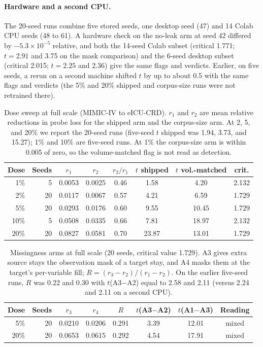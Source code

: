\documentclass[10pt]{article}
\theoremstyle{definition}
\begin{document}
\paragraph{Hardware and a second CPU.} The 20-seed runs combine five stored seeds, one desktop seed (47) and 14 Colab CPU seeds (48 to 61). A hardware check on the no-leak arm at seed 42 differed by $-5.3\times 10^{-5}$ relative, and both the 14-seed Colab subset (critical 1.771; $t=2.91$ and 3.75 on the mask comparison) and the 6-seed desktop subset (critical 2.015; $t=2.25$ and 2.36) give the same flags and verdicts. Earlier, on five seeds, a rerun on a second machine shifted $t$ by up to about 0.5 with the same flags and verdicts (the 5\% and 20\% shipped and corpus-size runs were not retrained there).

\begin{table}[h]
\centering\footnotesize\setlength{\tabcolsep}{4pt}
\begin{tabular}{@{}rrcccccc@{}}
\toprule
Dose & Seeds & $r_1$ & $r_2$ & $r_2/r_1$ & $t$ shipped & $t$ vol.-matched & crit.\\
\midrule
1\%  & 5  & 0.0053 & 0.0025 & 0.46 & 1.58 & 4.20 & 2.132\\
2\%  & 20 & 0.0117 & 0.0067 & 0.57 & 4.21 & 6.59 & 1.729\\
5\%  & 20 & 0.0293 & 0.0176 & 0.60 & 9.55 & 10.45 & 1.729\\
10\% & 5  & 0.0508 & 0.0335 & 0.66 & 7.81 & 18.97 & 2.132\\
20\% & 20 & 0.0827 & 0.0581 & 0.70 & 23.87 & 13.01 & 1.729\\
\bottomrule
\end{tabular}
\caption{Dose sweep at full scale (MIMIC-IV to eICU-CRD). $r_1$ and $r_2$ are mean relative reductions in probe loss for the shipped arm and the corpus-size arm. At 2, 5, and 20\% we report the 20-seed runs (five-seed $t$ shipped was 1.94, 3.73, and 15.27); 1\% and 10\% are five-seed runs. At 1\% the corpus-size arm is within 0.005 of zero, so the volume-matched flag is not read as detection.}
\label{tab:fulldose}
\end{table}

\begin{table}[h]
\centering\footnotesize\setlength{\tabcolsep}{4pt}
\begin{tabular}{@{}rrcccccc@{}}
\toprule
Dose & Seeds & $r_3$ & $r_4$ & $R$ & $t$(A3$-$A2) & $t$(A1$-$A3) & Reading\\
\midrule
5\%  & 20 & 0.0210 & 0.0206 & 0.291 & 3.39 & 12.01 & mixed\\
20\% & 20 & 0.0653 & 0.0615 & 0.292 & 4.54 & 17.91 & mixed\\
\bottomrule
\end{tabular}
\caption{Missingness arms at full scale (20 seeds, critical value 1.729). A3 gives extra source stays the observation mask of a target stay, and A4 masks them at the target's per-variable fill; $R=(r_3-r_2)/(r_1-r_2)$. On the earlier five-seed runs, $R$ was 0.22 and 0.30 with $t$(A3$-$A2) equal to 2.58 and 2.11 (versus 2.24 and 2.11 on a second CPU).}
\label{tab:fullmiss}
\end{table}
\end{document}

